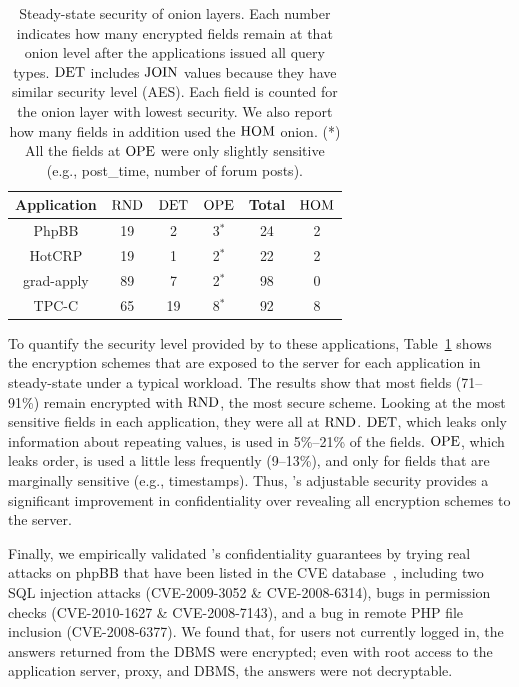 \begin{table}
\begin{tabular}{@{}c|c|c|c||c||c@{}}
\bf Application & 	\bf $\textrm{RND}$ & 	\bf $\textrm{DET}$ & 	\bf $\textrm{OPE}$ & 	\bf Total & 	$\textrm{HOM}$ \\
\hline
PhpBB &          19   &   		 2    &    		 3$^*$  &   		 24 & 		2  \\
HotCRP &	 	19 & 		1 & 			2$^*$ & 	 		22 &  	2 \\
grad-apply & 	 89& 		7  & 			2$^*$  & 		98 &  	0 \\
TPC-C & 		65 & 		19 &  		8$^*$ & 			92 & 		8
\end{tabular}
\caption{Steady-state security of onion layers. Each number indicates how many encrypted fields remain at that onion level after the applications issued all query types. $\textrm{DET}$ includes $\textrm{JOIN}$ values because they have similar security level (AES). Each field is counted for the onion layer with lowest security. We also report how many fields in addition used the $\textrm{HOM}$ onion. (*) All the fields at $\textrm{OPE}$ were only slightly sensitive (e.g., post\_time, number of forum posts).} 
\label{t:onion}
\end{table}



To quantify the security level provided by \name to these
applications, Table~\ref{t:onion} shows the encryption schemes that
are exposed to the server for each application in steady-state under a
typical workload.  The results show that most fields (71--91\%) remain
encrypted with $\textrm{RND}$, the most secure scheme. Looking at the most
sensitive fields in each application, they were all at $\textrm{RND}$. $\textrm{DET}$,
which leaks only information about repeating values, is used in
5\%--21\% of the fields.  $\textrm{OPE}$, which leaks order, is used a little
less frequently (9--13\%), and only for fields that are marginally
sensitive (e.g., timestamps).  Thus, \name's adjustable security
provides a significant improvement in confidentiality over revealing
all encryption schemes to the server.

Finally, we empirically validated \name's confidentiality guarantees
by trying real attacks on phpBB that have been listed in the CVE
database~\cite{cve:stats}, including two SQL injection attacks
(CVE-2009-3052 \& CVE-2008-6314), bugs in permission checks
(CVE-2010-1627 \& CVE-2008-7143), and a bug in remote PHP file
inclusion (CVE-2008-6377).  We found that, for users not currently
logged in, the answers returned from the DBMS were encrypted; even
with root access to the application server, proxy, and DBMS, the
answers were not decryptable.

